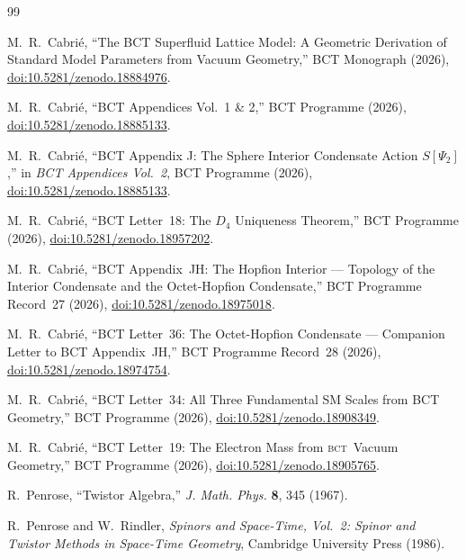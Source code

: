 \documentclass[aps,prl,preprint,superscriptaddress,floatfix]{revtex4-2}
\newcommand{\BCT}{\textsc{bct}}
\begin{document}
\begin{thebibliography}{99}

M.~R.~Cabri\'{e},
``The BCT Superfluid Lattice Model: A Geometric Derivation of Standard
Model Parameters from Vacuum Geometry,''
BCT Monograph (2026),
\href{https://doi.org/10.5281/zenodo.18884976}{doi:10.5281/zenodo.18884976}.

M.~R.~Cabri\'{e},
``BCT Appendices Vol.~1 \& 2,''
BCT Programme (2026),
\href{https://doi.org/10.5281/zenodo.18885133}{doi:10.5281/zenodo.18885133}.

M.~R.~Cabri\'{e},
``BCT Appendix J: The Sphere Interior Condensate Action $S[\Psi_2]$,''
in \textit{BCT Appendices Vol.~2}, BCT Programme (2026),
\href{https://doi.org/10.5281/zenodo.18885133}{doi:10.5281/zenodo.18885133}.

M.~R.~Cabri\'{e},
``BCT Letter~18: The $D_4$ Uniqueness Theorem,''
BCT Programme (2026),
\href{https://doi.org/10.5281/zenodo.18957202}{doi:10.5281/zenodo.18957202}.

M.~R.~Cabri\'{e},
``BCT Appendix~JH: The Hopfion Interior ---
Topology of the Interior Condensate and the Octet-Hopfion Condensate,''
BCT Programme Record~27 (2026),
\href{https://doi.org/10.5281/zenodo.18975018}{doi:10.5281/zenodo.18975018}.

M.~R.~Cabri\'{e},
``BCT Letter~36: The Octet-Hopfion Condensate ---
Companion Letter to BCT Appendix~JH,''
BCT Programme Record~28 (2026),
\href{https://doi.org/10.5281/zenodo.18974754}{doi:10.5281/zenodo.18974754}.

M.~R.~Cabri\'{e},
``BCT Letter~34: All Three Fundamental SM Scales from BCT Geometry,''
BCT Programme (2026),
\href{https://doi.org/10.5281/zenodo.18908349}{doi:10.5281/zenodo.18908349}.

M.~R.~Cabri\'{e},
``BCT Letter~19: The Electron Mass from \BCT\ Vacuum Geometry,''
BCT Programme (2026),
\href{https://doi.org/10.5281/zenodo.18905765}{doi:10.5281/zenodo.18905765}.

R.~Penrose,
``Twistor Algebra,''
\textit{J. Math. Phys.} \textbf{8}, 345 (1967).

R.~Penrose and W.~Rindler,
\textit{Spinors and Space-Time, Vol.~2: Spinor and Twistor Methods in
Space-Time Geometry},
Cambridge University Press (1986).


\end{thebibliography}
\end{document}
